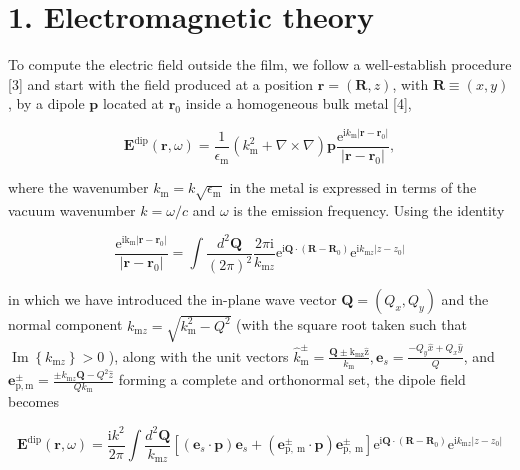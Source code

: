 \documentclass[10pt]{article}
\begin{document}
\section*{1. Electromagnetic theory}
To compute the electric field outside the film, we follow a well-establish procedure [3] and start with the field produced at a position $\mathbf{r}=(\mathbf{R}, z)$, with $\mathbf{R} \equiv(x, y)$, by a dipole $\mathbf{p}$ located at $\mathbf{r}_{0}$ inside a homogeneous bulk metal [4],

$$
\mathbf{E}^{\mathrm{dip}}(\mathbf{r}, \omega)=\frac{1}{\epsilon_{\mathrm{m}}}\left(k_{\mathrm{m}}^{2}+\nabla \times \nabla\right) \mathbf{p} \frac{\mathrm{e}^{\mathrm{i} k_{\mathrm{m}}\left|\mathbf{r}-\mathbf{r}_{0}\right|}}{\left|\mathbf{r}-\mathbf{r}_{0}\right|},
$$

where the wavenumber $k_{\mathrm{m}}=k \sqrt{\epsilon_{\mathrm{m}}}$ in the metal is expressed in terms of the vacuum wavenumber $k= \omega / c$ and $\omega$ is the emission frequency. Using the identity

$$
\frac{\mathrm{e}^{\mathrm{i} \mathrm{k}_{\mathrm{m}}\left|\mathbf{r}-\mathbf{r}_{0}\right|}}{\left|\mathbf{r}-\mathbf{r}_{0}\right|}=\int \frac{d^{2} \mathbf{Q}}{(2 \pi)^{2}} \frac{2 \pi \mathrm{i}}{k_{\mathrm{m} z}} \mathrm{e}^{\mathrm{i} \mathbf{Q} \cdot\left(\mathbf{R}-\mathbf{R}_{0}\right)} \mathrm{e}^{\mathrm{i} k_{\mathrm{m} z}\left|z-z_{0}\right|}
$$

in which we have introduced the in-plane wave vector $\mathbf{Q}=\left(Q_{x}, Q_{y}\right)$ and the normal component $k_{\mathrm{m} z}= \sqrt{k_{\mathrm{m}}^{2}-Q^{2}}$ (with the square root taken such that $\operatorname{Im}\left\{k_{\mathrm{m} z}\right\}>0$ ), along with the unit vectors $\hat{k}_{\mathrm{m}}^{ \pm}= \frac{\mathbf{Q} \pm \mathrm{k}_{\mathrm{mz}} \hat{\mathrm{z}}}{k_{\mathrm{m}}}, \mathbf{e}_{s}=\frac{-Q_{y} \hat{x}+Q_{x} \hat{y}}{Q}$, and $\mathbf{e}_{\mathrm{p}, \mathrm{m}}^{ \pm}=\frac{ \pm k_{\mathrm{m} z} \mathbf{Q}-Q^{2} \hat{z}}{Q k_{\mathrm{m}}}$ forming a complete and orthonormal set, the dipole field becomes

$$
\mathbf{E}^{\operatorname{dip}}(\mathbf{r}, \omega)=\frac{\mathrm{i} k^{2}}{2 \pi} \int \frac{d^{2} \mathbf{Q}}{k_{\mathrm{m} z}}\left[\left(\mathbf{e}_{s} \cdot \mathbf{p}\right) \mathbf{e}_{s}+\left(\mathbf{e}_{\mathrm{p}, \mathrm{~m}}^{ \pm} \cdot \mathbf{p}\right) \mathbf{e}_{\mathrm{p}, \mathrm{~m}}^{ \pm}\right] \mathrm{e}^{\mathrm{i} \mathbf{Q} \cdot\left(\mathbf{R}-\mathbf{R}_{0}\right)} \mathrm{e}^{\mathrm{i} k_{\mathrm{m} z}\left|z-z_{0}\right|}
$$
\end{document}
